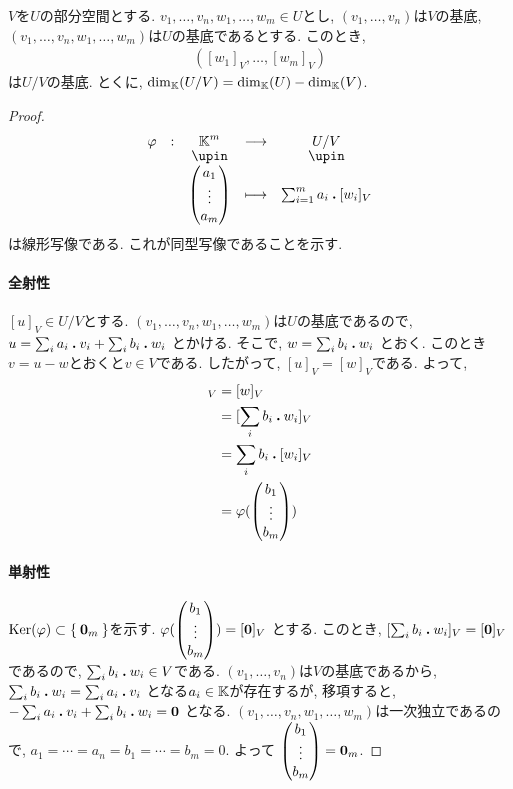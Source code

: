\begin{theorem}
  \label{thm:dim:quotient}
  $V$を$U$の部分空間とする.
  $v_1,\ldots, v_n,w_1,\ldots,w_m\in U$とし,
  $(v_1,\ldots, v_n)$は$V$の基底,
  $(v_1,\ldots, v_n,w_1,\ldots, w_m)$は$U$の基底であるとする.
  このとき,
  \begin{align*}
    ([w_1]_V,\ldots, [w_m]_V)
  \end{align*}
  は$U/V$の基底.
  とくに, $\dim_{\mathbb{K}}(U/V)=\dim_{\mathbb{K}}(U)-\dim_{\mathbb{K}}(V)$.
\end{theorem}
\begin{proof}
  \begin{align*}
    \shazo{\varphi}{\KK^m}{U/V}
          {\begin{pmatrix}a_1\\\vdots\\a_m\end{pmatrix}}
          {\sum_{i=1}^m a_i\act [w_i]_V}
  \end{align*}
  は線形写像である.
  これが同型写像であることを示す.
  \paragraph{全射性}
  $[u]_V\in U/V$とする.
  $(v_1,\ldots, v_n,w_1,\ldots, w_m)$は$U$の基底であるので,
  $u=\sum_{i}a_i\mathbin{\boldsymbol{.}} v_i+\sum_{i}b_i \mathbin{\boldsymbol{.}} w_i$
  とかける.
  そこで,
  $w=\sum_{i}b_i \mathbin{\boldsymbol{.}} w_i$
  とおく.
  このとき$v=u-w$とおくと$v\in V$である.
  したがって, $[u]_V=[w]_V$である.
  よって,
  \begin{align*}
    [u]_V
    &=[w]_V\\
    &=[\sum_{i}b_i \act w_i]_V\\
    &=\sum_{i}b_i \act[ w_i]_V\\
    &=\varphi(\begin{pmatrix}b_1\\\vdots\\b_m\end{pmatrix})\\
  \end{align*}
  \paragraph{単射性}
  $\operatorname{Ker}(\varphi)\subset\Set{\boldsymbol{0}_m}$を示す.
  $\varphi(\begin{pmatrix}b_1\\\vdots\\b_m\end{pmatrix})=[\boldsymbol{0}]_V$
  とする.
  このとき,
  $[\sum_{i}b_i \mathbin{\boldsymbol{.}} w_i]_V=[\boldsymbol{0}]_V$
  であるので, $\sum_{i}b_i \mathbin{\boldsymbol{.}} w_i\in V$である.
  $(v_1,\ldots, v_n)$は$V$の基底であるから,
  $\sum_{i}b_i \mathbin{\boldsymbol{.}} w_i=\sum_{i}a_i\mathbin{\boldsymbol{.}} v_i$
  となる$a_i\in \mathbb{K}$が存在するが,
  移項すると,
  $-\sum_{i}a_i\mathbin{\boldsymbol{.}} v_i+\sum_{i}b_i \mathbin{\boldsymbol{.}} w_i=\boldsymbol{0}$
  となる.
  $(v_1,\ldots, v_n,w_1,\ldots, w_m)$は一次独立であるので,
  $a_1=\cdots=a_n=b_1=\cdots=b_m=0$.
  よって
  $\begin{pmatrix}b_1\\\vdots\\b_m\end{pmatrix}=\boldsymbol{0}_m$.
\end{proof}


